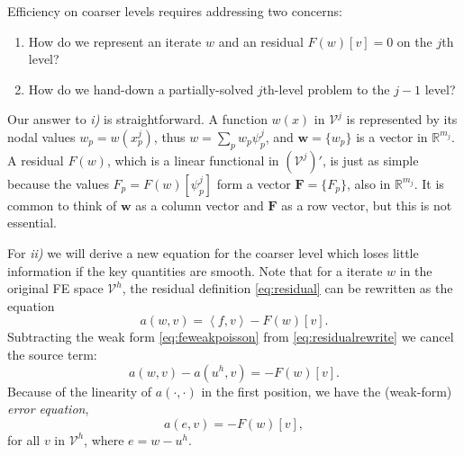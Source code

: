 \documentclass[letterpaper,final,12pt,reqno]{amsart}
\theoremstyle{claim}
\newcommand{\RR}{\mathbb{R}}
\newcommand{\bw}{\mathbf{w}}
\newcommand{\bF}{\mathbf{F}}
\newcommand{\ip}[2]{\left<#1,#2\right>}
\numberwithin{equation}{section}
\numberwithin{figure}{section}
\numberwithin{table}{section}
\begin{document}
Efficiency on coarser levels requires addressing two concerns:
\renewcommand{\labelenumi}{\emph{\roman{enumi})}}
\begin{enumerate}
\item How do we represent an iterate $w$ and an residual $F(w)[v]=0$ on the $j$th level?
\item How do we hand-down a partially-solved $j$th-level problem to the $j-1$ level?
\end{enumerate}

Our answer to \emph{i)} is straightforward.  A function $w(x)$ in $\mathcal{V}^j$ is represented by its nodal values $w_p=w(x_p^j)$, thus $w = \sum_p w_p \psi_p^j$, and $\bw = \{w_p\}$ is a vector in $\RR^{m_j}$.  A residual $F(w)$, which is a linear functional in $(\mathcal{V}^j)'$, is just as simple because the values $F_p = F(w)[\psi_p^j]$ form a vector $\bF=\{F_p\}$, also in $\RR^{m_j}$.  It is common to think of $\bw$ as a column vector and $\bF$ as a row vector, but this is not essential.

For \emph{ii)} we will derive a new equation for the coarser level which loses little information if the key quantities are smooth.  Note that for a iterate $w$ in the original FE space $\mathcal{V}^h$, the residual definition \eqref{eq:residual} can be rewritten as the equation
\begin{equation}
  a(w,v) = \ip{f}{v} - F(w)[v].  \label{eq:residualrewrite}
\end{equation}
Subtracting the weak form \eqref{eq:feweakpoisson} from \eqref{eq:residualrewrite} we cancel the source term:
\begin{equation}
  a(w,v) - a(u^h,v) = - F(w)[v].  \label{eq:errorequationearly}
\end{equation}
Because of the linearity of $a(\cdot,\cdot)$ in the first position, we have the (weak-form) \emph{error equation},
\begin{equation}
  a(e,v) = - F(w)[v],  \label{eq:errorequation}
\end{equation}
for all $v$ in $\mathcal{V}^h$, where $e=w-u^h$.
\end{document}
